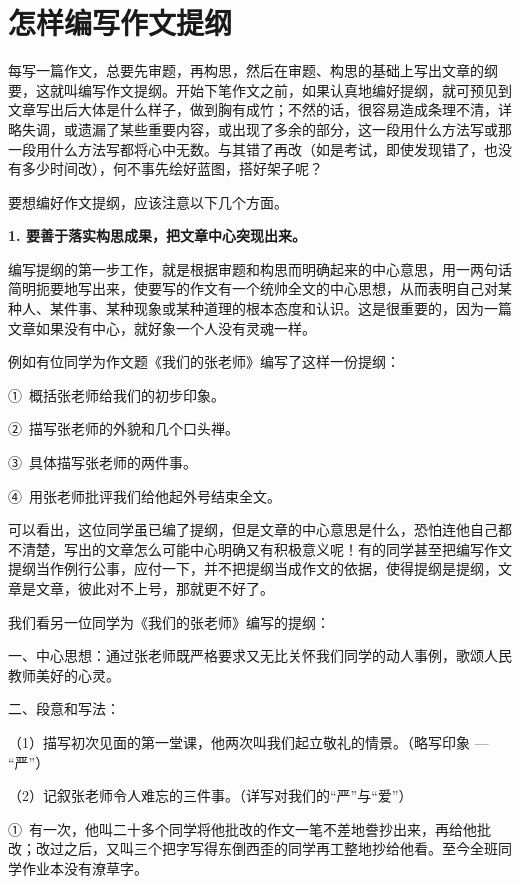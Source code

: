 \section{怎样编写作文提纲}

每写一篇作文，总要先审题，再构思，然后在审题、构思的基础上写出文章的纲要，这就叫编写作文提纲。开始下笔作文之前，如果认真地编好提纲，就可预见到文章写出后大体是什么样子，做到胸有成竹；不然的话，很容易造成条理不清，详略失调，或遗漏了某些重要内容，或出现了多余的部分，这一段用什么方法写或那一段用什么方法写都将心中无数。与其错了再改（如是考试，即使发现错了，也没有多少时间改），何不事先绘好蓝图，搭好架子呢？

要想编好作文提纲，应该注意以下几个方面。

\textbf{1. 要善于落实构思成果，把文章中心突现出来。}

编写提纲的第一步工作，就是根据审题和构思而明确起来的中心意思，用一两句话简明扼要地写出来，使要写的作文有一个统帅全文的中心思想，从而表明自己对某种人、某件事、某种现象或某种道理的根本态度和认识。这是很重要的，因为一篇文章如果没有中心，就好象一个人没有灵魂一样。

例如有位同学为作文题《我们的张老师》编写了这样一份提纲：

①\ 概括张老师给我们的初步印象。

②\ 描写张老师的外貌和几个口头禅。

③\ 具体描写张老师的两件事。

④\ 用张老师批评我们给他起外号结束全文。

可以看出，这位同学虽已编了提纲，但是文章的中心意思是什么，恐怕连他自己都不清楚，写出的文章怎么可能中心明确又有积极意义呢！有的同学甚至把编写作文提纲当作例行公事，应付一下，并不把提纲当成作文的依据，使得提纲是提纲，文章是文章，彼此对不上号，那就更不好了。

我们看另一位同学为《我们的张老师》编写的提纲：

\noindent
[作文提纲]

一、中心思想：通过张老师既严格要求又无比关怀我们同学的动人事例，歌颂人民教师美好的心灵。

二、段意和写法：

（1）描写初次见面的第一堂课，他两次叫我们起立敬礼的情景。（略写印象 --- “严”）

（2）记叙张老师令人难忘的三件事。（详写对我们的“严”与“爱”）

①\ 有一次，他叫二十多个同学将他批改的作文一笔不差地誊抄出来，再给他批改；改过之后，又叫三个把字写得东倒西歪的同学再工整地抄给他看。至今全班同学作业本没有潦草字。

